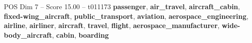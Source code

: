 \begin{textsample}{POS Dim 7 – Score 15.00 – t011173}  \label{ex:f7_pos_037}
\textbf{passenger}, \textbf{air\_travel}, \textbf{aircraft\_cabin}, \textbf{fixed-wing\_aircraft}, \textbf{public\_transport}, \textbf{aviation}, \textbf{aerospace\_engineering}, \textbf{airline}, \textbf{airliner}, \textbf{aircraft}, \textbf{travel}, \textbf{flight}, \textbf{aerospace\_manufacturer}, \textbf{wide-body\_aircraft}, \textbf{cabin}, \textbf{boarding}

\end{textsample}
